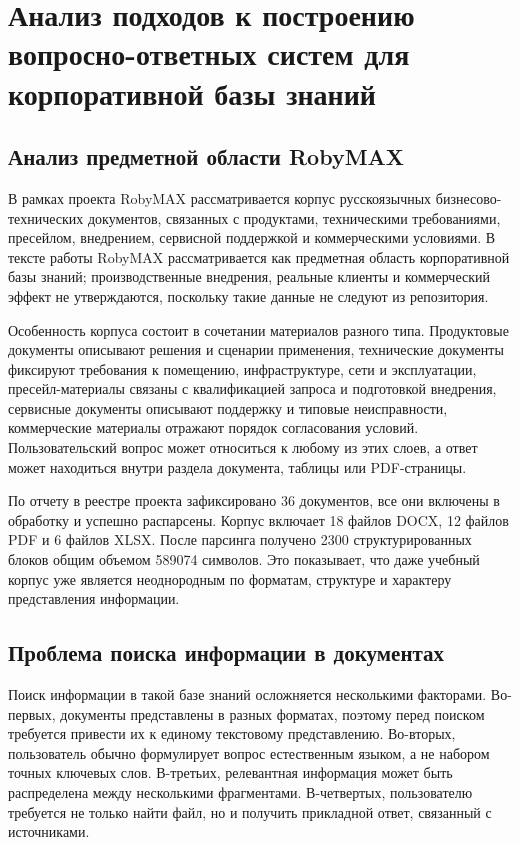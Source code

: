 \chapter{Анализ подходов к построению вопросно-ответных систем для корпоративной базы знаний}
\label{chapter:analytics}

\section{Анализ предметной области RobyMAX}

В рамках проекта RobyMAX рассматривается корпус русскоязычных бизнесово-технических документов, связанных с продуктами, техническими требованиями, пресейлом, внедрением, сервисной поддержкой и коммерческими условиями. В тексте работы RobyMAX рассматривается как предметная область корпоративной базы знаний; производственные внедрения, реальные клиенты и коммерческий эффект не утверждаются, поскольку такие данные не следуют из репозитория.

Особенность корпуса состоит в сочетании материалов разного типа. Продуктовые документы описывают решения и сценарии применения, технические документы фиксируют требования к помещению, инфраструктуре, сети и эксплуатации, пресейл-материалы связаны с квалификацией запроса и подготовкой внедрения, сервисные документы описывают поддержку и типовые неисправности, коммерческие материалы отражают порядок согласования условий. Пользовательский вопрос может относиться к любому из этих слоев, а ответ может находиться внутри раздела документа, таблицы или PDF-страницы.

По отчету  в реестре проекта зафиксировано 36 документов, все они включены в обработку и успешно распарсены. Корпус включает 18 файлов DOCX, 12 файлов PDF и 6 файлов XLSX. После парсинга получено 2300 структурированных блоков общим объемом 589074 символов. Это показывает, что даже учебный корпус уже является неоднородным по форматам, структуре и характеру представления информации.

\section{Проблема поиска информации в документах}

Поиск информации в такой базе знаний осложняется несколькими факторами. Во-первых, документы представлены в разных форматах, поэтому перед поиском требуется привести их к единому текстовому представлению. Во-вторых, пользователь обычно формулирует вопрос естественным языком, а не набором точных ключевых слов. В-третьих, релевантная информация может быть распределена между несколькими фрагментами. В-четвертых, пользователю требуется не только найти файл, но и получить прикладной ответ, связанный с источниками.

